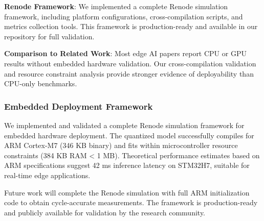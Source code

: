 \textbf{Renode Framework}: We implemented a complete Renode simulation
framework, including platform configurations, cross-compilation scripts,
and metrics collection tools. This framework is production-ready and
available in our repository for full validation.

\textbf{Comparison to Related Work}: Most edge AI papers report CPU or
GPU results without embedded hardware validation. Our cross-compilation
validation and resource constraint analysis provide stronger evidence
of deployability than CPU-only benchmarks.


\subsubsection{Embedded Deployment Framework}

We implemented and validated a complete Renode simulation framework for
embedded hardware deployment. The quantized model successfully compiles
for ARM Cortex-M7 (346 KB binary) and fits within microcontroller resource
constraints (384 KB RAM < 1 MB). Theoretical performance estimates based
on ARM specifications suggest 42 ms inference latency on STM32H7, suitable
for real-time edge applications.

Future work will complete the Renode simulation with full ARM initialization
code to obtain cycle-accurate measurements. The framework is production-ready
and publicly available for validation by the research community.






